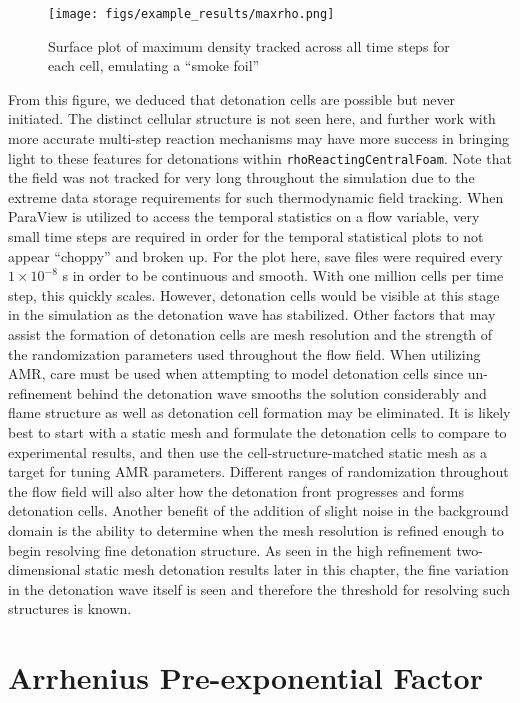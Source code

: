 \begin{figure}[t!]
\centering
\texttt{[image: figs/example\_results/maxrho.png]}
\caption{Surface plot of maximum density tracked across all time steps for each cell, emulating a ``smoke foil''}
\label{fig:maxrho}
\end{figure}

From this figure, we deduced that detonation cells are possible but never initiated. The distinct cellular structure is not seen here, and further work with more accurate multi-step reaction mechanisms may have more success in bringing light to these features for detonations within \verb|rhoReactingCentralFoam|. Note that the field was not tracked for very long throughout the simulation due to the extreme data storage requirements for such thermodynamic field tracking. When ParaView is utilized to access the temporal statistics on a flow variable, very small time steps are required in order for the temporal statistical plots to not appear ``choppy'' and broken up. For the plot here, save files were required every \(1 \times 10^{ - 8}\) s in order to be continuous and smooth. With one million cells per time step, this quickly scales. However, detonation cells would be visible at this stage in the simulation as the detonation wave has stabilized. Other factors that may assist the formation of detonation cells are mesh resolution and the strength of the randomization parameters used throughout the flow field. When utilizing AMR, care must be used when attempting to model detonation cells since un-refinement behind the detonation wave smooths the solution considerably and flame structure as well as detonation cell formation may be eliminated. It is likely best to start with a static mesh and formulate the detonation cells to compare to experimental results, and then use the cell-structure-matched static mesh as a target for tuning AMR parameters. Different ranges of randomization throughout the flow field will also alter how the detonation front progresses and forms detonation cells. Another benefit of the addition of slight noise in the background domain is the ability to determine when the mesh resolution is refined enough to begin resolving fine detonation structure. As seen in the high refinement two-dimensional static mesh detonation results later in this chapter, the fine variation in the detonation wave itself is seen and therefore the threshold for resolving such structures is known. 



\section{Arrhenius Pre-exponential Factor}
\label{sec:a}

